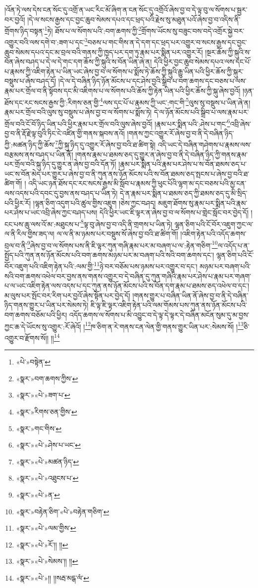 །འོན་ཏེ་ལས་དེས་ངན་སོང་དུ་འགྲོ་ན་ཡང་རིང་མོ་ཞིག་ན་ངན་སོང་དུ་འགྲོའོ་ཞེས་བྱ་བ་དེ་ལྟ་བུ་ལ་སོགས་པ་སྦྱར་བར་བྱའོ། །དེ་ལ་སངས་རྒྱས་དང་བྱང་ཆུབ་སེམས་དཔའ་དང་ཕྲད་པའི་རྗེས་སུ་མཐུན་པའོ་ཞེས་བྱ་བ་འདིས་ནི་གྲོགས་ཉིད་བསྟན་\footnote{«པེ་»བསྟེན་}ཏེ། ཐོས་པ་ལ་སོགས་པའི་:བག་ཆགས་ཀྱི་\footnote{«སྣར་»བག་ཆགས་ཀྱིས་}གྲོགས་ཡོངས་སུ་བཟུང་བས་བདེ་འགྲོར་སྐྱེ་བར་འགྱུར་བའི་ལས་དགེ་བ་:ཟག་པ་དང་\footnote{«སྣར་»«པེ་»ཟག་པ་}བཅས་པ་གང་གིས་ན་དེ་དག་དང་ཕྲད་པར་འགྱུར་བ་སངས་རྒྱས་དང་བྱང་ཆུབ་སེམས་དཔའ་དང་མ་བྲལ་བའི་གནས་ཀྱི་ཁྱད་པར་དག་ཏུ་རྣམ་པར་སྨིན་པར་འགྱུར་རོ། །སྔར་ཆོས་ཀྱི་སྐུའི་ས་བོན་ཞེས་བཤད་པ་དེ་ལ་དེ་གང་དག་ཆོས་ཀྱི་སྐུའི་ས་བོན་ཡིན་ཞེ་ན། དེའི་ཕྱིར་བྱང་ཆུབ་སེམས་དཔའ་ལས་དང་པོ་པ་རྣམས་ཀྱི་འཇིག་རྟེན་པ་ཡིན་ཡང་ཞེས་བྱ་བ་ལ་སོགས་པ་སྨོས་ཏེ་ཆོས་ཀྱི་སྐུའི་རྒྱུ་ཡིན་པའི་ཕྱིར་ཆོས་ཀྱི་སྐུར་བསྡུས་པ་ཞེས་བཤད་དོ། །དེ་ལ་དེ་བཞིན་ཉིད་ཉོན་མོངས་པ་དང་ཤེས་བྱའི་སྒྲིབ་པ་བག་ཆགས་དང་བཅས་པ་ལས་རྣམ་པར་གྲོལ་བ་ནི་སྟོབས་དང་མི་འཇིགས་པ་ལ་སོགས་པའི་ཆོས་ཀྱི་རྟེན་ཡིན་པའི་ཕྱིར་ཆོས་ཀྱི་སྐུ་ཞེས་བྱའོ། །ཉན་ཐོས་དང་རང་སངས་རྒྱས་ཀྱི་:རིགས་ཅན་གྱི་\footnote{«སྣར་»རིགས་ཅན་གྱིས་}ལས་དང་པོ་པ་རྣམས་ཀྱི་ཡང་:གང་གི་\footnote{«སྣར་»གང་གིས་}ལུས་སུ་བསྡུས་པ་ཡིན་ཞེ་ན། རྣམ་པར་གྲོལ་བའི་ལུས་སུ་བསྡུས་པ་ཞེས་བྱ་བ་ལ་སོགས་པ་སྨོས་ཏེ། དེ་ལ་ཉོན་མོངས་པའི་སྒྲིབ་པ་ལས་རྣམ་པར་གྲོལ་བའི་ངོ་བོ་ཉིད་ཡིན་པའི་ཕྱིར་རྣམ་པར་གྲོལ་བའི་ལུས་ཞེས་བྱའོ། །རྣམ་པར་སྨིན་པའི་:ཤེས་པ་གང་\footnote{«སྣར་»«པེ་»ཤེས་པ་ཡང་}འབྲི་ཞེས་བྱ་བ་ནི་རྡོ་རྗེ་ལྟ་བུའི་ཏིང་ངེ་འཛིན་གྱི་གནས་སྐབས་ནའོ། །གནས་ཀྱང་འགྱུར་རོ་ཞེས་བྱ་བ་ནི་དེ་བཞིན་ཉིད་ཀྱི་:མཚན་ཉིད་ཀྱི་ཆོས་\footnote{«སྣར་»«པེ་»མཚན་ཉིད་}ཀྱི་སྐུ་ཉིད་དུ་འགྱུར་རོ་ཞེས་བྱ་བའི་ཐ་ཚིག་སྟེ། འདི་ཡང་དེ་བཞིན་གཤེགས་པ་རྣམས་ལས་བརྩམས་ནས་བཤད་པ་ཡིན་ནོ། །གནས་རྣམ་པ་ཐམས་ཅད་དུ་གྱུར་ན་ཞེས་བྱ་བ་ནི་དེ་བཞིན་ཉིད་ཀྱི་གནས་རྣམ་པར་གྲོལ་བའི་སྐུ་ཉིད་དུ་གྱུར་ན་ཞེས་བྱ་བའི་དོན་ཏོ། །རྣམ་པར་སྨིན་པའི་རྣམ་པར་ཤེས་པ་ས་བོན་ཐམས་ཅད་པ་ཡང་ས་བོན་མེད་པར་གྱུར་པ་ཞེས་བྱ་བ་ནི་ཀུན་ནས་ཉོན་མོངས་པའི་ས་བོན་ཐམས་ཅད་སྤངས་པ་ཞེས་བྱ་བའི་ཐ་ཚིག་གོ། །
འདི་ཡང་ཉན་ཐོས་དང་རང་སངས་རྒྱས་མི་སློབ་པ་རྣམས་ཀྱི་ཕུང་པོའི་ལྷག་མ་དང་བཅས་པའི་མྱ་ངན་ལས་འདས་པའི་དབང་དུ་བྱས་ནས་བཤད་པ་ཡིན་ཏེ། དེ་ན་རྣམ་པར་སྨིན་པ་ཐམས་ཅད་ཀྱི་ཐམས་ཅད་དུ་མི་སྲིད་པའི་ཕྱིར་རོ། །ལྷན་ཅིག་འདུག་པའི་ཚུལ་གྱིས་འཇུག །ཅེས་ཀྱང་བཤད། མཇུག་ཐོགས་སུ་རྣམ་པར་སྨིན་པའི་རྣམ་པར་ཤེས་པ་ཡང་འབྲི་ཞེས་ཀྱང་བཤད་པས། དེའི་ཕྱིར་ཡང་ཇི་ལྟར་ན་ཞེས་བྱ་བ་ལ་སོགས་པ་གླེང་སློང་བར་བྱེད་དོ། །ངང་པས་ཆུ་ལས་འོ་མ་:མཐུངས་པ་\footnote{«སྣར་»«པེ་»འཐུངས་པ་}ལྟ་བུ་ཞེས་བྱ་བ་འདི་ནི་གྲགས་པ་ཡིན་ཏེ། ལྷན་ཅིག་པའི་ངོ་བོར་འཇུག་ཀྱང་ལ་ལ་ནི་རིལ་གྱིས་ཟད་ལ། ལ་ལ་ནི་མ་ཉམས་པར་བསྡུས་སོ་ཞེས་བྱ་བའི་ཐ་ཚིག་གོ། །འཇིག་རྟེན་པའི་འདོད་ཆགས་བྲལ་བ་ནི་\footnote{«སྣར་»«པེ་»ན་}ཞེས་བྱ་བ་ལ་སོགས་པས་ནི་ཇི་ལྟར་ཀུན་གཞི་རྣམ་པར་མ་བཞག་པ་ལ་:རྟེན་གཅིག་\footnote{«སྣར་»བརྟེན་ཅིག་«པེ་»བརྟེན་གཅིག་}ལ་འདོད་པ་ན་སྤྱོད་པའི་ཀུན་ནས་ཉོན་མོངས་པའི་བག་ཆགས་མཉམ་པར་མ་བཞག་པའི་སའི་བག་ཆགས་དང་། ལྷན་ཅིག་པའི་ངོ་བོར་འཇུག་པའི་འཇིག་རྟེན་པའི་:ལམ་གྱི་\footnote{«སྣར་»«པེ་»ལམ་གྱིས་}ཉེ་བར་བཅོམ་པས་ཉམས་པར་འགྱུར་བ་དང་། མཉམ་པར་བཞག་པའི་སའི་བག་ཆགས་འཕེལ་བར་བྱས་ནས་གནས་འགྱུར་བ་དེ་བཞིན་དུ་ཀུན་གཞིའི་རྣམ་པར་ཤེས་པ་རྣམ་པར་གཞག་པ་ལ་ཡང་འཇིག་རྟེན་ལས་འདས་པ་དང་ཀུན་ནས་ཉོན་མོངས་པའི་ས་བོན་དག་རྣམ་པ་ཐམས་ཅད་འཕེལ་བ་དང་། མ་ལུས་པར་སྤོང་བར་རིག་པར་བྱའོ་ཞེས་སྟོན་པར་བྱེད་དོ། །གནས་གྱུར་པ་བཞིན་ཡིན་ནོ་ཞེས་བྱ་བ་ནི་དེ་བཞིན་ཉིད་གནས་གྱུར་པ་ཡིན་པར་སེམས་ཏེ། ཇི་ལྟ་ཇི་ལྟར་འཇིག་རྟེན་པའི་ལམ་གོམས་པས་ཀུན་ནས་ཉོན་མོངས་པའི་བག་ཆགས་བཅོམ་པའི་ཕྱིར། འདོད་ཆགས་ལ་སོགས་པ་མི་འབྱུང་བ་དེ་ལྟ་དེ་ལྟར་དེ་བཞིན་མངོན་སུམ་དུ་མ་བྱས་ཀྱང་ཆ་དེ་ཡོངས་སུ་འགྱུར་:རོ་ཞེའོ། །\footnote{«སྣར་»«པེ་»རོ་།། །།}ཁ་ཅིག་ན་རེ་གནས་ངན་ལེན་གྱི་གནས་གྱུར་ཡིན་པར་:སེམས་སོ། །\footnote{«སྣར་»«པེ་»སེམས་།། །།}ཅི་འགྱུར་བ་རྫོགས་སོ།། །།\footnote{«སྣར་»«པེ་»།། །།སརྦ་མངྒ་ལཾ་}